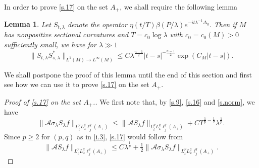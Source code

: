 \documentclass[10pt]{amsart}
\newtheorem{lemma}[theorem]{Lemma}
\newcommand{\la}{\lambda}
\newcommand{\1}{{\bf 1}}
\newcommand{\A}{{\mathcal A}}
\begin{document}
In order to prove \eqref{s.17} on the set $A_+$, we shall require the following lemma
\begin{lemma}\label{kerprop} Let $S_{t,\la}$ denote the operator
$\eta(t/T) \beta(P/\la)e^{-it\la^{-1}\Delta_g}$.
Then if $M$ has nonpositive sectional curvatures and $T=c_0\log\la$ with 
$c_0=c_0(M)>0$ sufficiently small, we have for $\la\gg 1$
\begin{equation}\label{j1}
\|S_{t,\la}S^*_{s,\la}\|_{L^1(M)\to L^\infty(M)}\le C\la^{\frac{n-1}2}|t-s|^{-\frac{n-1}2} \exp(C_M|t-s|).
\end{equation}
\end{lemma}
We shall postpone the proof of this lemma until the end of this section and first see how we can use it to prove  \eqref{s.17} on the set $A_+$.


\begin{proof}[Proof of \eqref{s.17} on the set $A_+$.]
We first note that, by \eqref{s.9}, \eqref{s.16} and \eqref{s.norm},
we have
$$ \| \A \sigma_\la S_\la f\|_{L^p_tL^q_x\ell^q_j(A_+)} \le \| \A S_\la f\|_{L^p_tL^q_x\ell^q_j(A_+)} + CT^{\frac1{p}-\frac12}\la^{\frac1{p}}.
$$
Since $p\ge2$ for $(p,q)$ as in \eqref{i.3},  \eqref{s.17} would follow from
\begin{equation}\label{high'}
\| \A S_\la f\|_{L^p_tL^q_x\ell^q_j(A_+)}\le C\la^{\frac1{p}}+\tfrac12 \|\A \sigma_\la S_\la f\|_{L^p_tL^q_x\ell^q_j(A_+)}.
\end{equation}



\end{proof}
\end{document}

